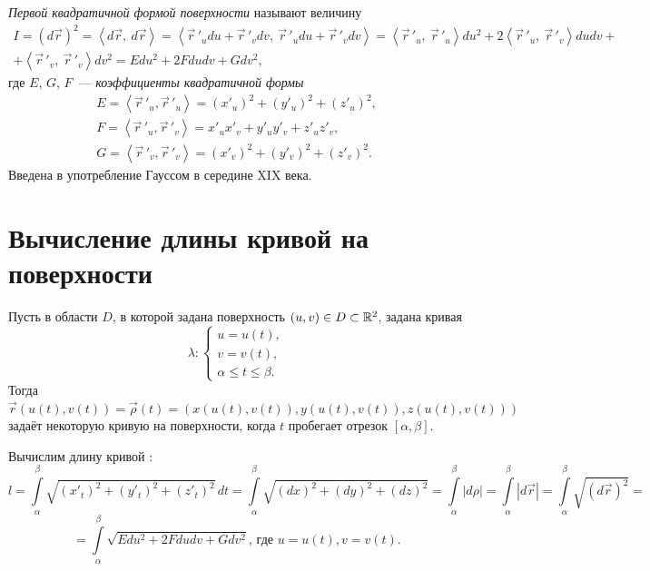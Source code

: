 \documentclass[../../main.tex]{subfiles}
\begin{document}
 \emph{Первой квадратичной формой поверхности} называют величину 
 \begin{gather*}
 I = (d\vec{r})^2 = \left<d\vec{r}, \ d\vec{r}
 \right> = \left<\vec r\,'_udu + \vec r\,'_vdv, \ 
 \vec r\,'_udu + \vec r\,'_vdv\right> = \left<\vec 
 r\,'_u, \ \vec r\,'_u\right>du^2 + 
 2\left<\vec r\,'_u, \ \vec r\,'_v\right>dudv + \\ 
 + \left<\vec r\,'_v, \ \vec r\,'_v\right>dv^2 = 
 Edu^2 + 2Fdudv + Gdv^2,
 \end{gather*}
 где $E$, $G$, $F$~--- \emph{коэффициенты квадратичной формы}
\begin{gather*}
E = \left<\vec r\,'_u, \vec r\,'_u\right> = (x'_u)^2 + (y'_u)^2 + (z'_u)^2, \\
F = \left<\vec r\,'_u, \vec r\,'_v\right> = x'_ux'_v + y'_uy'_v + z'_uz'_v, \\
G = \left<\vec r\,'_v, \vec r\,'_v\right> = (x'_v)^2 + (y'_v)^2 + (z'_v)^2.
\end{gather*}
Введена в употребление Гауссом в середине XIX века.

\section{Вычисление длины кривой на поверхности}

Пусть в области $D$, в которой задана поверхность 
$(u, v) \in D \subset \mathbb{R}^2$, задана кривая 
\[\lambda : \begin{cases}
             u = u(t),\\
             v = v(t),\\
             \alpha \leq t \leq \beta.
            \end{cases}\]
Тогда $\vec{r}(u(t), v(t)) = \vec{\rho}(t) = (x(u(t), v(t)), y(u(t), 
v(t)), z(u(t), v(t)))$ задаёт некоторую кривую на поверхности, когда $t$ 
пробегает отрезок $\left[\alpha, \beta\right]$.

Вычислим длину кривой : 
\[
l = \int\limits_\alpha^\beta\sqrt{(x'_t)^2 + (y'_t)^2 + (z'_t)^2}\,dt = 
\int\limits_\alpha^\beta\sqrt{(dx)^2 + (dy)^2 + (dz)^2} = 
\int\limits_\alpha^\beta  |d\rho| =  \int\limits_\alpha^\beta|d\vec{r}| = 
\int\limits_\alpha^\beta\sqrt{(d\vec{r})^2} = \] 
\[ 
= \int\limits_\alpha^\beta\sqrt{Edu^2 + 2Fdudv + Gdv^2} \text{, где } u = u(t), v = v(t). 
\]
\end{document}

